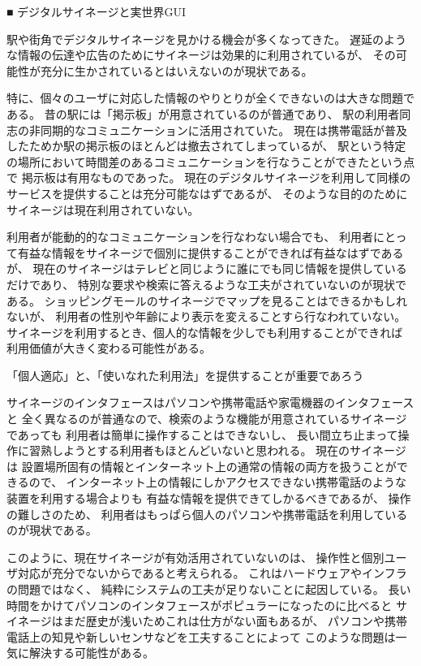 ■ デジタルサイネージと実世界GUI

駅や街角でデジタルサイネージを見かける機会が多くなってきた。
遅延のような情報の伝達や広告のためにサイネージは効果的に利用されているが、
その可能性が充分に生かされているとはいえないのが現状である。

特に、個々のユーザに対応した情報のやりとりが全くできないのは大きな問題である。
昔の駅には「掲示板」が用意されているのが普通であり、
駅の利用者同志の非同期的なコミュニケーションに活用されていた。
現在は携帯電話が普及したためか駅の掲示板のほとんどは撤去されてしまっているが、
駅という特定の場所において時間差のあるコミュニケーションを行なうことができたという点で
掲示板は有用なものであった。
現在のデジタルサイネージを利用して同様のサービスを提供することは充分可能なはずであるが、
そのような目的のためにサイネージは現在利用されていない。

利用者が能動的的なコミュニケーションを行なわない場合でも、
利用者にとって有益な情報をサイネージで個別に提供することができれば有益なはずであるが、
現在のサイネージはテレビと同じように誰にでも同じ情報を提供しているだけであり、
特別な要求や検索に答えるような工夫がされていないのが現状である。
ショッピングモールのサイネージでマップを見ることはできるかもしれないが、
利用者の性別や年齢により表示を変えることすら行なわれていない。
サイネージを利用するとき、個人的な情報を少しでも利用することができれば
利用価値が大きく変わる可能性がある。

「個人適応」と、「使いなれた利用法」を提供することが重要であろう

サイネージのインタフェースはパソコンや携帯電話や家電機器のインタフェースと
全く異なるのが普通なので、検索のような機能が用意されているサイネージであっても
利用者は簡単に操作することはできないし、
長い間立ち止まって操作に習熟しようとする利用者もほとんどいないと思われる。
現在のサイネージは
設置場所固有の情報とインターネット上の通常の情報の両方を扱うことができるので、
インターネット上の情報にしかアクセスできない携帯電話のような装置を利用する場合よりも
有益な情報を提供できてしかるべきであるが、
操作の難しさのため、
利用者はもっぱら個人のパソコンや携帯電話を利用しているのが現状である。

このように、現在サイネージが有効活用されていないのは、
操作性と個別ユーザ対応が充分でないからであると考えられる。
これはハードウェアやインフラの問題ではなく、
純粋にシステムの工夫が足りないことに起因している。
長い時間をかけてパソコンのインタフェースがポピュラーになったのに比べると
サイネージはまだ歴史が浅いためこれは仕方がない面もあるが、
パソコンや携帯電話上の知見や新しいセンサなどを工夫することによって
このような問題は一気に解決する可能性がある。

